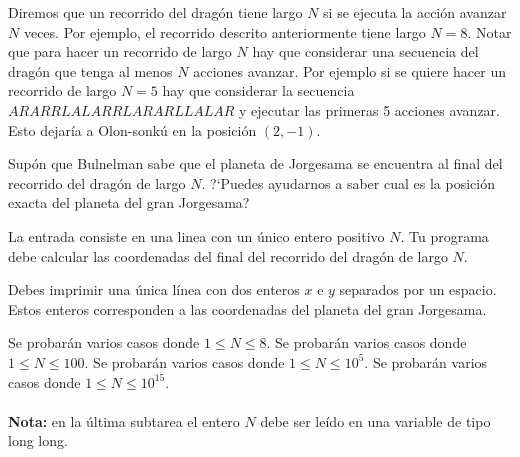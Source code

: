 \documentclass{oci}
\begin{document}
Diremos que un recorrido del dragón tiene largo $N$ si se ejecuta la acción avanzar $N$ veces.
Por ejemplo, el recorrido descrito anteriormente tiene largo $N = 8$.
Notar que para hacer un recorrido de largo $N$ hay que considerar una secuencia del dragón que tenga al menos $N$ acciones avanzar.
Por ejemplo si se quiere hacer un recorrido de largo $N=5$ hay que considerar la secuencia $ARARRLALARRLARARLLALAR$ y ejecutar
las primeras 5 acciones avanzar.
Esto dejaría a Olon-sonkú en la posición $(2,-1)$.

Supón que Bulnelman sabe que el planeta de Jorgesama se encuentra al final del recorrido del dragón de largo $N$.
?`Puedes ayudarnos a saber cual es la posición exacta del planeta del gran Jorgesama?


\begin{inputDescription}
La entrada consiste en una linea con un único entero positivo $N$.
Tu programa debe calcular las coordenadas del final del recorrido del dragón de largo $N$.
\end{inputDescription}

\begin{outputDescription}
Debes imprimir una única línea con dos enteros $x$ e $y$ separados por un espacio.
Estos enteros corresponden a las coordenadas del planeta del gran Jorgesama.
\end{outputDescription}

\begin{scoreDescription}
 Se probarán varios casos donde $1 \leq N \leq 8$.
 Se probarán varios casos donde $1 \leq N \leq 100$.
 Se probarán varios casos donde $1 \leq N \leq 10^5$.
 Se probarán varios casos donde $1 \leq N \leq 10^{15}$. 
\\
\\
{\bf Nota:} en la última subtarea el entero $N$ debe ser leído en una variable de tipo long long.
\end{scoreDescription}

\begin{sampleDescription}
\end{sampleDescription}
\end{document}
